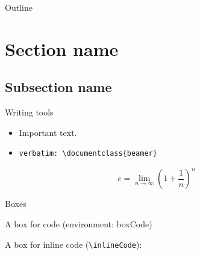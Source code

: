 \documentclass[t]{lib/SMbeamer}
\begin{document}
\maketitle


\begin{frame}{Outline}   
  \tableofcontents[hideallsubsections] %
\end{frame}


\section{Section name}


\subsection{Subsection name}


\begin{frame}[fragile]{Writing tools}  %
  \begin{itemize}
    \item \alert{Important text.}
    \item \begin{verbatim}verbatim: \documentclass{beamer} \end{verbatim}
  \end{itemize}
  \[
    e = \lim_{n\to \infty} {\left(1 + \frac{1}{n}\right)}^n
  \]
\end{frame}


\begin{frame}[fragile]{Boxes}
   
  

  \begin{boxCode}[language=Python]
    A box for code (environment: boxCode)
  \end{boxCode}

  A box for inline code (\texttt{\textbackslash inlineCode}): 
\end{frame}
\end{document}
